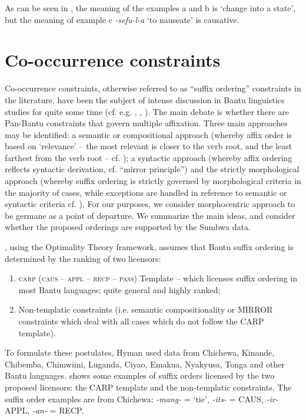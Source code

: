 \documentclass[output=paper		  ]{langscibook}
\begin{document}
{As can be seen in , the meaning of the examples a and b is ‘change into a state’, but the meaning of example c} {\textit{{}-sefu-l-a}} {‘to nauseate’ is causative.}

\section{Co-occurrence constraints}\label{sec:kahigi:3}

{Co-occurrence constraints, otherwise referred to as “suffix ordering” constraints in the literature, have been the subject of intense discussion in Bantu linguistics studies for quite some time (cf. e.g. \citealt{Baker1985}, \citealt{Alsina1999}, \citealt{Hyman2002}). The main debate is whether there are Pan-Bantu constraints that govern multiple affixation. Three main approaches may be identified: a semantic or compositional approach (whereby affix order is based on ‘relevance’ -- the most relevant is closer to the verb root, and the least farthest from the verb root -- cf. \citet{Bybee1985}); a syntactic approach (whereby affix ordering reflects syntactic derivation, cf.  ``mirror principle'') and the strictly morphological approach (whereby suffix ordering is strictly governed by morphological criteria in the majority of cases, while exceptions are handled in reference to semantic or syntactic criteria cf. \citealt{Hyman2002}). For our purposes, we consider  morphocentric approach to be germane as a point of departure. We summarize the main ideas, and consider whether the proposed orderings are supported by the Sumbwa data.}

{\citet{Hyman2002}, using the Optimality Theory framework, assumes that Bantu suffix ordering is determined by the ranking of two licensors:}

\begin{enumerate}
\item \textsc{carp (caus -- appl -- recp -- pass)} Template -- which licenses suffix ordering in most Bantu languages; quite general and highly ranked;

\item {Non-templatic constraints (i.e. semantic compositionality or MIRROR constraints which deal with all cases which do not follow the CARP template).}
\end{enumerate}


To formulate these postulates, Hyman used data from Chichewa, Kinande, Chibemba, Chimwiini, Luganda, Ciyao, Emakua, Nyakyusa, Tonga and other Bantu languages.  shows some examples of suffix orders licensed by the two proposed licensors: the CARP template and the non-templatic constraints. The suffix order examples are from Chichewa: {\textit{{}-mang-}} {= ‘tie’,} {\textit{{}-its-}} {= CAUS,} {\textit{{}-ir-}} {APPL,} {\textit{{}-an-}} {= RECP.}
\end{document}
